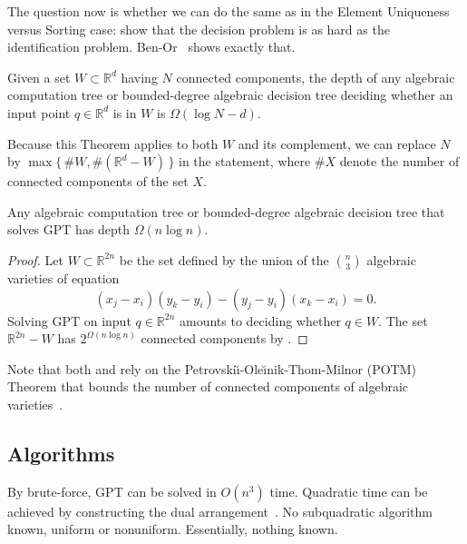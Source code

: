 The question now is whether we can do the same as in the Element Uniqueness
versus Sorting case: show that the decision problem is as hard as the identification
problem. Ben-Or~\cite{Be83} shows exactly that.
%
\begin{theorem}[name=Ben-Or~\cite{Be83},label=thm:Be83]
    Given a set \(W \subset \mathbb{R}^d\) having \(N\) connected components,
    the depth of any algebraic
    computation tree or bounded-degree algebraic decision tree
    deciding whether an input point \(q \in \mathbb{R}^d\) is in \(W\)
    is \(\Omega(\log N - d)\).
\end{theorem}
%
Because this Theorem applies to both \(W\) and its complement, we can replace
\(N\) by \(\max \{\, \# W , \#(\mathbb{R}^d - W)\,\}\) in the statement,
where \(\# X\) denote the number of connected components of the set \(X\).

\begin{corollary}
    Any algebraic computation tree or bounded-degree algebraic decision tree
    that solves GPT has depth \(\Omega(n \log n)\).
\end{corollary}

\begin{proof}
    Let \(W \subset \mathbb{R}^{2n}\) be the set defined by the union of the
    \(n \choose 3\) algebraic varieties of equation
    \begin{displaymath}
	(x_j - x_i)(y_k - y_i) - (y_j - y_i)(x_k - x_i) = 0.
    \end{displaymath}
    Solving GPT on input \(q \in \mathbb{R}^{2n}\)
    amounts to deciding whether \(q \in W\).
    The set \(\mathbb{R}^{2n} - W\) has \(2^{\Omega(n \log n)}\) connected
    components by
    .
\end{proof}

Note that both
and
 rely on
the
Petrovski\u{\i}-Ole\u{\i}nik-Thom-Milnor (POTM) Theorem that
bounds the number of connected components of
algebraic varieties~\cite{Mi64,Th65,BPR06}.


\subsection{Algorithms}%
\label{sec:history:pol:algorithms}

By brute-force, GPT can be solved in \(O(n^3)\) time.
%
Quadratic time can be achieved by constructing the dual
arrangement~\cite[Theorem 24.4.1]{Hal04}.
%
No subquadratic algorithm known, uniform or nonuniform.
%
Essentially, nothing known.
%


